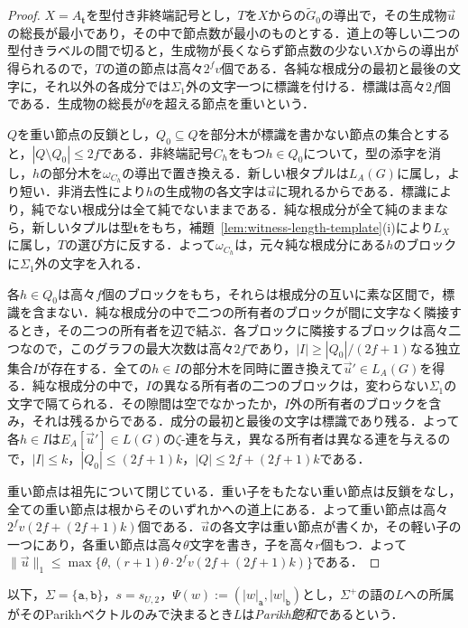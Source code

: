 \documentclass[11pt,a4paper]{ltjsarticle}
\numberwithin{equation}{section}
\theoremstyle{plain}
\theoremstyle{definition}
\theoremstyle{remark}
\newcommand{\tuple}[1]{\vec{#1}}
\begin{document}
\begin{proof}
$X=A_{\mathbf t}$を型付き非終端記号とし，$T$を$X$からの$\widetilde G_0$の導出で，その生成物$\tuple u$の総長が最小であり，その中で節点数が最小のものとする．道上の等しい二つの型付きラベルの間で切ると，生成物が長くならず節点数の少ない$X$からの導出が得られるので，$T$の道の節点は高々$2^fv$個である．各純な根成分の最初と最後の文字に，それ以外の各成分では$\Sigma_1$外の文字一つに標識を付ける．標識は高々$2f$個である．生成物の総長が$\theta$を超える節点を重いという．

$Q$を重い節点の反鎖とし，$Q_0\subseteq Q$を部分木が標識を書かない節点の集合とすると，$|Q\setminus Q_0|\le2f$である．非終端記号$C_h$をもつ$h\in Q_0$について，型の添字を消し，$h$の部分木を$\omega_{C_h}$の導出で置き換える．新しい根タプルは$L_A(G)$に属し，より短い．非消去性により$h$の生成物の各文字は$\tuple u$に現れるからである．標識により，純でない根成分は全て純でないままである．純な根成分が全て純のままなら，新しいタプルは型$\mathbf t$をもち，補題~\ref{lem:witness-length-template}(i)により$L_X$に属し，$T$の選び方に反する．よって$\omega_{C_h}$は，元々純な根成分にある$h$のブロックに$\Sigma_1$外の文字を入れる．

各$h\in Q_0$は高々$f$個のブロックをもち，それらは根成分の互いに素な区間で，標識を含まない．純な根成分の中で二つの所有者のブロックが間に文字なく隣接するとき，その二つの所有者を辺で結ぶ．各ブロックに隣接するブロックは高々二つなので，このグラフの最大次数は高々$2f$であり，$|I|\ge|Q_0|/(2f+1)$なる独立集合$I$が存在する．全ての$h\in I$の部分木を同時に置き換えて$\tuple u'\in L_A(G)$を得る．純な根成分の中で，$I$の異なる所有者の二つのブロックは，変わらない$\Sigma_1$の文字で隔てられる．その隙間は空でなかったか，$I$外の所有者のブロックを含み，それは残るからである．成分の最初と最後の文字は標識であり残る．よって各$h\in I$は$E_A[\tuple u']\in L(G)$の$\zeta$-連を与え，異なる所有者は異なる連を与えるので，$|I|\le k$，$|Q_0|\le(2f+1)k$，$|Q|\le2f+(2f+1)k$である．

重い節点は祖先について閉じている．重い子をもたない重い節点は反鎖をなし，全ての重い節点は根からそのいずれかへの道上にある．よって重い節点は高々$2^fv(2f+(2f+1)k)$個である．$\tuple u$の各文字は重い節点が書くか，その軽い子の一つにあり，各重い節点は高々$\theta$文字を書き，子を高々$r$個もつ．よって$\|\tuple u\|_1\le\max\{\theta,(r+1)\theta\cdot2^fv(2f+(2f+1)k)\}$である．
\end{proof}

以下，$\Sigma=\{\mathtt a,\mathtt b\}$，$s=s_{U,2}$，$\Psi(w):=(|w|_{\mathtt a},|w|_{\mathtt b})$とし，$\Sigma^+$の語の$L$への所属がそのParikhベクトルのみで決まるとき$L$は\emph{Parikh飽和}であるという．
\end{document}
